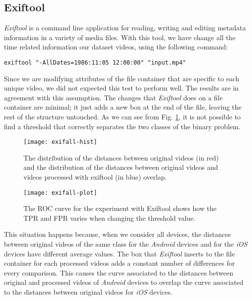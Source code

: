 \subsection{Exiftool}

\emph{Exiftool} is a command line application for reading, writing and editing metadata information in a variety of media files. With this tool, we have change all the time related information our dataset videos, using the following command:

\begin{lstlisting}
exiftool "-AllDates=1986:11:05 12:00:00" "input.mp4"
\end{lstlisting}

Since we are modifying attributes of the file container that are specific to each unique video, we did not expected this test to perform well. The results are in agreement with this assumption. The changes that \emph{Exiftool} does on a file container are minimal; it just adds a new box at the end of the file, leaving the rest of the structure untouched. As we can see from Fig. \ref{fig:exifaal-hist}, it is not possible to find a threshold that correctly separates the two classes of the binary problem.

\begin{figure}
  \centering
  \texttt{[image: exifall-hist]}
  \caption{The distribution of the distances between original videos (in red) and the distribution of the distances between original videos and videos processed with exiftool (in blue) overlap.}\label{fig:exifaal-hist}
\end{figure}

\begin{figure}
  \centering
  \texttt{[image: exifall-plot]}
  \caption{The ROC curve for the experiment with Exiftool shows how the TPR and FPR varies when changing the threshold value.}\label{fig:brand-roc}
\end{figure}

This situation happens because, when we consider all devices, the distances between original videos of the same class for the \emph{Android} devices and for the \emph{iOS} devices have different average values. The box that \emph{Exiftool} inserts to the file container for each processed videos adds a constant number of differences for every comparison. This causes the curve associated to the distances between original and processed videos of \emph{Android} devices to overlap the curve associated to the distances between original videos for \emph{iOS} devices.

